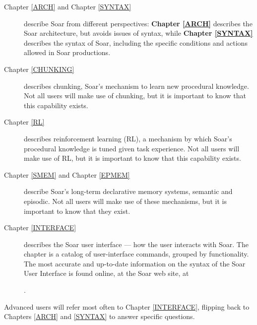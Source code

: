 \begin{description}
\item[Chapter \ref{ARCH} and Chapter \ref{SYNTAX}] describe Soar from
different perspectives: \textbf{Chapter \ref{ARCH}} describes the Soar
architecture, but avoids issues of syntax, while \textbf{Chapter \ref{SYNTAX}}
describes the syntax of Soar, including the specific conditions and actions
allowed in Soar productions.

\item[Chapter \ref{CHUNKING}] describes chunking, Soar's
mechanism to learn new procedural knowledge.  Not all users will make use of 
chunking, but it is important to know that this capability exists.

\item[Chapter \ref{RL}] describes reinforcement learning (RL), a mechanism
by which Soar's procedural knowledge is tuned given task experience.
Not all users will make use of RL, but it is important to know that this capability exists.

\item[Chapter \ref{SMEM} and Chapter \ref{EPMEM}] describe Soar's long-term declarative
memory systems, semantic and episodic. Not all users will make use of these mechanisms, 
but it is important to know that they exist.

\item[Chapter \ref{INTERFACE}] describes the Soar user interface --- how the
user interacts with Soar. The chapter is a catalog of user-interface commands,
grouped by functionality.  The most accurate and up-to-date information on the syntax of the 
Soar User Interface is found online, at the Soar web site, at

\hspace{2em}.

\end{description}

Advanced users will refer most often to Chapter \ref{INTERFACE}, flipping back
to Chapters \ref{ARCH} and \ref{SYNTAX} to answer specific questions.

